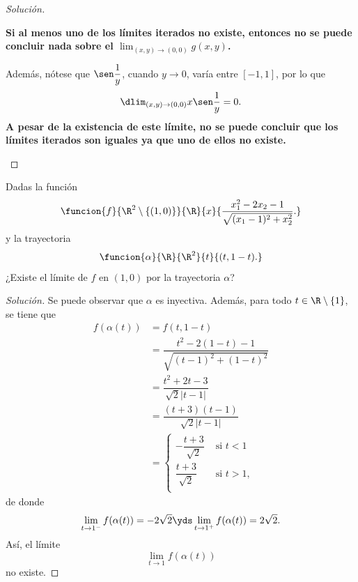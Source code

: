 \documentclass[a4,11pt]{aleph-notas}
\begin{document}
\begin{proof}[Solución]
\begin{enumerate}
            \textbf{Si al menos uno de los límites iterados no existe, entonces no se puede concluir nada sobre el \boldmath$\lim_{(x,y)\to (0,0)}g(x,y)$.} 
            
            Además, nótese que $\sen \dfrac{1}{y}$, cuando $y\to 0$, varía entre $[-1,1]$, por lo que 
            \[
                \dlim_{(x,y)\to (0,0)}x\sen \dfrac{1}{y}=0.
            \]
            \textbf{A pesar de la existencia de este límite, no se puede concluir que los límites iterados son iguales ya que uno de ellos no existe.} 
            
    \end{enumerate}
\end{proof}

\begin{ejer}
Dadas la función 
	\[
		\funcion{f}{\R^2\setminus\{(1,0)\}}{\R}{x}%
			{\dfrac{x_1^2-2x_2-1}{\sqrt{(x_1-1)^2+x_2^2}}.}
	\]
	y la trayectoria
	\[
		\funcion{\alpha}{\R}{\R^2}{t}{(t,1-t).}
	\]
	¿Existe el límite de $f$ en $(1,0)$ por la trayectoria $\alpha$?
\end{ejer}

\begin{proof}[Solución]
Se puede observar que $\alpha$ es inyectiva. Además, para todo $t\in\R\setminus\{1\}$, se tiene que
	\begin{align*}
		f(\alpha(t))
			&=f(t,1-t)\\
			&=\dfrac{t^2-2(1-t)-1}{\sqrt{(t-1)^2+(1-t)^2}}\\
			&=\dfrac{t^2+2t-3}{\sqrt 2 |t-1|}\\
			&=\dfrac{(t+3)(t-1)}{\sqrt 2 |t-1|}\\
			&=
				\begin{cases}
					-\dfrac{t+3}{\sqrt 2}&\text{ si }t<1\\[2mm]
					\dfrac{t+3}{\sqrt 2}&\text{ si }t>1,\\
				\end{cases}
	\end{align*}
	de donde
	\[
		\lim_{t\to 1^-}f(\alpha(t))=-2\sqrt 2
		\yds 
		\lim_{t\to 1^+}f(\alpha(t))=2\sqrt 2.
	\]
	Así, el límite
	\[
		\lim_{t\to 1}f(\alpha(t))
	\]
	no existe.
\end{proof}
\end{document}
